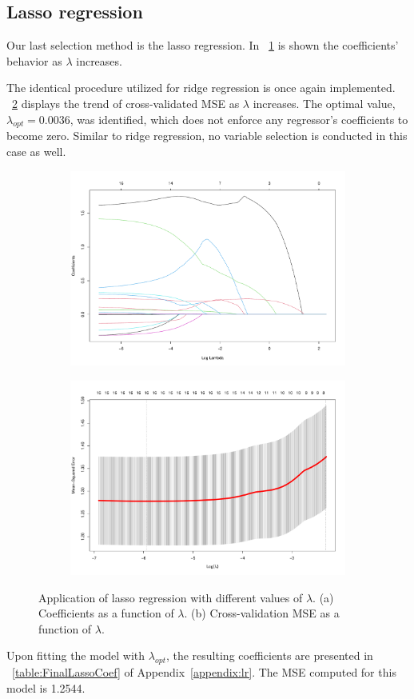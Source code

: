 \subsection{Lasso regression}

Our last selection method is the lasso regression. In \Fig~\ref{fig:LassoCoefVsLambda} is shown the coefficients' behavior as $\lambda$ increases. 

The identical procedure utilized for ridge regression is once again implemented. \Fig~\ref{fig:LassoCvPlot} displays the trend of cross-validated MSE as $\lambda$ increases. The optimal value, $\lambda_{opt} = 0.0036$, was identified, which does not enforce any regressor's coefficients to become zero. Similar to ridge regression, no variable selection is conducted in this case as well.

\begin{figure}[h]
	\centering
	\begin{subfigure}{.5\textwidth}
		\centering
		\includegraphics[width=0.7\linewidth]{ImageFiles/Regression/Lasso/LassoCoefVsLambda.pdf}
		\caption{}
		\label{fig:LassoCoefVsLambda}
	\end{subfigure}%
	\begin{subfigure}{.5\textwidth}
		\centering
		\includegraphics[width=0.7\linewidth]{ImageFiles/Regression/Lasso/LassoCvPlot.pdf}
		\caption{}
		\label{fig:LassoCvPlot}
	\end{subfigure}	
	\caption{Application of lasso regression with different values of $\lambda$. (a) Coefficients as a function of $\lambda$. (b) Cross-validation MSE as a function of $\lambda$.}
	\label{fig:FinalFSSM}
\end{figure}

Upon fitting the model with $\lambda_{opt}$, the resulting coefficients are presented in \Tab~\ref{table:FinalLassoCoef} of Appendix~\ref{appendix:lr}. The MSE computed for this model is 1.2544.
